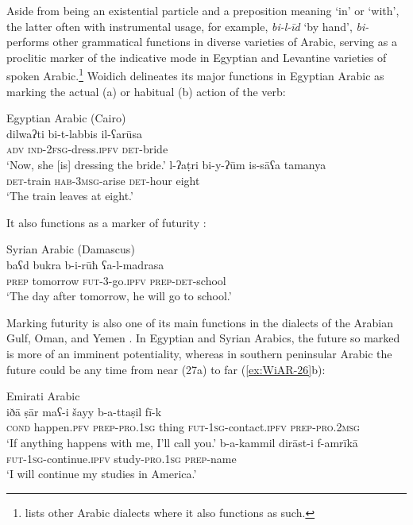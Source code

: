 \documentclass[output=paper]{langsci/langscibook}
\begin{document}
Aside from being an existential particle and a preposition meaning ‘in’ or ‘with’, the latter often with instrumental usage, for example, \textit{bi-l-īd} ‘by hand’, \textit{bi-} performs other grammatical functions in diverse varieties of Arabic, serving as a proclitic marker of the indicative mode in Egyptian \citep[61, 280–284]{woidich2006a} and Levantine \citep[180, 324–329]{cowell2005a} varieties of spoken Arabic.\footnote{\citet[64]{retsoe2014a} lists other Arabic dialects where it also functions as such.} Woidich delineates its major functions in Egyptian Arabic as marking the actual (a) or habitual (b) action of the verb:

\ea Egyptian Arabic (Cairo)\label{ex:WiAR-24}\\
  \ea
  	\gll dilwaʔti bi-t-labbis il-ʕarūsa\\
  	\textsc{adv} \textsc{ind-2fsg}-dress.\textsc{ipfv}	\textsc{det}-bride\\
  	\glt ‘Now, she [is] dressing the bride.’ \citep[281]{woidich2006a}
  \ex
  	\gll l-ʔaṭri bi-y-ʔūm is-sāʕa tamanya\\
  	\textsc{det}-train \textsc{hab-3msg}-arise \textsc{det}-hour eight\\
  	\glt ‘The train leaves at eight.’ \citep[281]{woidich2006a}
\z \z

It also functions as a marker of futurity \citep[326]{cowell2005a}:

\ea Syrian Arabic (Damascus)\label{ex:WiAR-25}\\
	\gll baʕd bukra b-i-rūħ ʕa-l-madrasa\\
	\textsc{prep} tomorrow \textsc{fut}-3-go.\textsc{ipfv} \textsc{prep-det}-school\\
	\glt ‘The day after tomorrow, he will go to school.’ \citep[324]{cowell2005a}
\z

Marking futurity is also one of its main functions in the dialects of the Arabian Gulf, Oman, and Yemen \citep{persson2008a, retsoe2011a, retsoe2014a}. In Egyptian and Syrian Arabics, the future so marked is more of an imminent potentiality, whereas in southern peninsular Arabic the future could be any time from near (27a) to far (\ref{ex:WiAR-26}b):

\ea Emirati Arabic\label{ex:WiAR-26}\\
  \ea
  	\gll iðā ṣār maʕ-i šayy b-a-ttaṣil fī-k\\
  	\textsc{cond} happen.\textsc{pfv} \textsc{prep-pro.1sg} thing \textsc{fut-1sg}-contact.\textsc{ipfv} \textsc{prep-pro.2msg}\\
  	\glt ‘If anything happens with me, I’ll call you.’ \citep[750]{jarad2017a}
  \ex
  	\gll b-a-kammil dirāst-i f-amrīkā\\
  	\textsc{fut-1sg}-continue.\textsc{ipfv} study-\textsc{pro.1sg} \textsc{prep}-name\\
  	\glt ‘I will continue my studies in America.’ \citep[751]{jarad2017a}
\z \z
\end{document}

